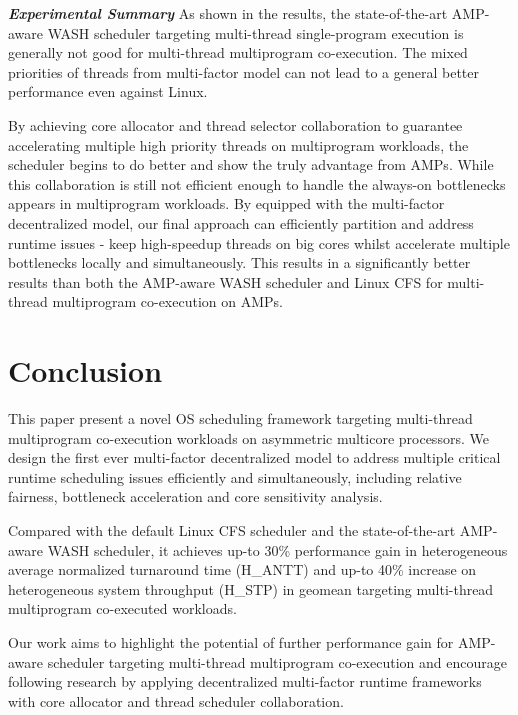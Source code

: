 \documentclass[sigplan,review,anonymous]{acmart}\settopmatter{printfolios=true,printccs=false,printacmref=false}
\begin{document}
\textbf{\textit{Experimental Summary}} As shown in the results, the state-of-the-art AMP-aware WASH scheduler targeting multi-thread single-program execution is generally not good for multi-thread multiprogram co-execution. The mixed priorities of threads from multi-factor model can not lead to a general better performance even against Linux. 

By achieving core allocator and thread selector collaboration to guarantee accelerating multiple high priority threads on multiprogram workloads, the scheduler begins to do better and show the truly advantage from AMPs. While this collaboration is still not efficient enough to handle the always-on bottlenecks appears in multiprogram workloads. By equipped with the multi-factor decentralized model, our final approach can efficiently partition and address runtime issues - keep high-speedup threads on big cores whilst accelerate multiple bottlenecks locally and simultaneously. This results in a significantly better results than both the AMP-aware WASH scheduler and Linux CFS for multi-thread multiprogram co-execution on AMPs.  

\section{Conclusion}
This paper present a novel OS scheduling framework targeting multi-thread multiprogram co-execution workloads on asymmetric multicore processors. We design the first ever multi-factor decentralized model to address multiple critical runtime scheduling issues efficiently and simultaneously, including relative fairness, bottleneck acceleration and core sensitivity analysis. 

Compared with the default Linux CFS scheduler and the state-of-the-art AMP-aware WASH scheduler, it achieves up-to 30\% performance gain in heterogeneous average normalized turnaround time (H\_ANTT) and up-to 40\% increase on heterogeneous system throughput (H\_STP) in geomean targeting multi-thread multiprogram co-executed workloads. 

Our work aims to highlight the potential of further performance gain for AMP-aware scheduler targeting multi-thread multiprogram co-execution and encourage following research by applying decentralized multi-factor runtime frameworks with core allocator and thread scheduler collaboration. 
\end{document}
